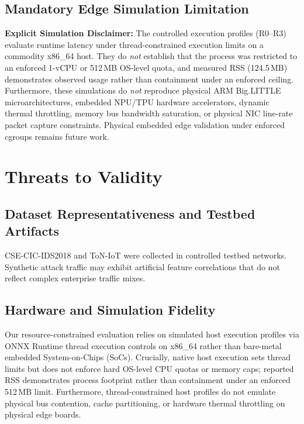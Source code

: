 \documentclass[journal]{IEEEtran}
\begin{document}
\subsection{Mandatory Edge Simulation Limitation}
\label{sec:sim_limitation}
\textbf{Explicit Simulation Disclaimer:} The controlled execution profiles (R0--R3) evaluate runtime latency under thread-constrained execution limits on a commodity x86\_64 host. They do \emph{not} establish that the process was restricted to an enforced 1-vCPU or 512\,MB OS-level quota, and measured RSS (124.5\,MB) demonstrates observed usage rather than containment under an enforced ceiling. Furthermore, these simulations do \emph{not} reproduce physical ARM Big.LITTLE microarchitectures, embedded NPU/TPU hardware accelerators, dynamic thermal throttling, memory bus bandwidth saturation, or physical NIC line-rate packet capture constraints. Physical embedded edge validation under enforced cgroups remains future work.


\section{Threats to Validity}
\label{sec:threats}

\subsection{Dataset Representativeness and Testbed Artifacts}
CSE-CIC-IDS2018 and ToN-IoT were collected in controlled testbed networks. Synthetic attack traffic may exhibit artificial feature correlations that do not reflect complex enterprise traffic mixes.

\subsection{Hardware and Simulation Fidelity}
Our resource-constrained evaluation relies on simulated host execution profiles via ONNX Runtime thread execution controls on x86\_64 rather than bare-metal embedded System-on-Chips (SoCs). Crucially, native host execution sets thread limits but does not enforce hard OS-level CPU quotas or memory caps; reported RSS demonstrates process footprint rather than containment under an enforced 512\,MB limit. Furthermore, thread-constrained host profiles do not emulate physical bus contention, cache partitioning, or hardware thermal throttling on physical edge boards.
\end{document}
